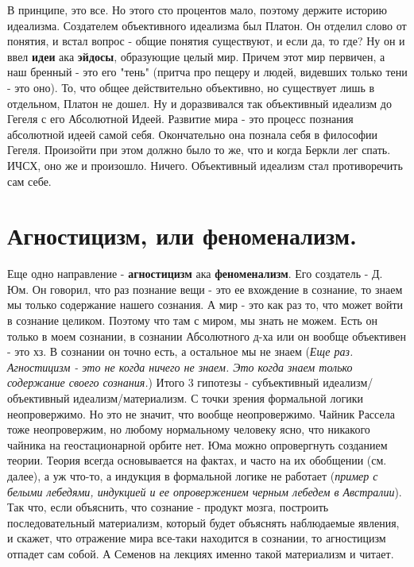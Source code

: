 В принципе, это все. Но этого сто процентов мало, поэтому держите историю идеализма. Создателем объективного идеализма был Платон. Он отделил слово от понятия, и встал вопрос - общие понятия существуют, и если да, то где? Ну он и ввел \textbf{идеи} ака \textbf{эйдосы}, образующие целый мир. Причем этот мир первичен, а наш бренный - это его "тень" (притча про пещеру и людей, видевших только тени - это оно). То, что общее действительно объективно, но существует лишь в отдельном, Платон не дошел. Ну и доразвивался так объективный идеализм до Гегеля с его Абсолютной Идеей. Развитие мира - это процесс познания абсолютной идеей самой себя. Окончательно она познала себя в философии Гегеля. Произойти при этом должно было то же, что и когда Беркли лег спать. ИЧСХ, оно же и произошло. Ничего. Объективный идеализм стал противоречить сам себе.

\section{ Агностицизм, или феноменализм.}
Еще одно направление - \textbf{агностицизм} ака \textbf{феноменализм}. Его создатель - Д. Юм. Он говорил, что раз познание вещи - это ее вхождение в сознание, то знаем мы только содержание нашего сознания. А мир - это как раз то, что может войти в сознание целиком. Поэтому что там с миром, мы знать не можем. Есть он только в моем сознании, в сознании Абсолютного д-ха или он вообще объективен - это хз. В сознании он точно есть, а остальное мы не знаем (\textit{Еще раз. Агностицизм - это не когда ничего не знаем. Это когда знаем только содержание своего сознания.}) Итого 3 гипотезы - субъективный идеализм/объективный идеализм/материализм. С точки зрения формальной логики неопровержимо. Но это не значит, что вообще неопровержимо. Чайник Рассела тоже неопровержим, но любому нормальному человеку ясно, что никакого чайника на геостационарной орбите нет. Юма можно опровергнуть созданием теории. Теория всегда основывается на фактах, и часто на их обобщении (см. далее), а уж что-то, а индукция в формальной логике не работает (\textit{пример с белыми лебедями, индукцией и ее опровержением черным лебедем в Австралии}). Так что, если объяснить, что сознание - продукт мозга, построить последовательный материализм, который будет объяснять наблюдаемые явления, и скажет, что отражение мира все-таки находится в сознании, то агностицизм отпадет сам собой. А Семенов на лекциях именно такой материализм и читает. 

